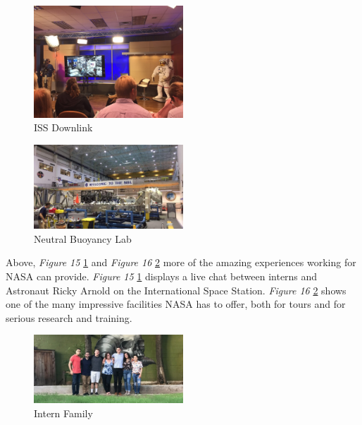 \documentclass{article}
\begin{document}
\begin{figure}[!htb]
  \centering
  \includegraphics[width=0.5\textwidth]{assets/videodemonstration.png}
  \caption{ISS Downlink}
  \label{fig:videodemonstration}
\end{figure}

\begin{figure}[!htb]
  \centering
  \includegraphics[width=0.5\textwidth]{assets/welcometonbl.png}
  \caption{Neutral Buoyancy Lab}
  \label{fig:welcometonbl}
\end{figure}

Above, \textit{Figure 15} \ref{fig:videodemonstration} and 
\textit{Figure 16} \ref{fig:welcometonbl} more of the amazing 
experiences working for NASA can provide. \textit{Figure 15} 
\ref{fig:videodemonstration} displays a live chat between interns and 
Astronaut Ricky Arnold on the International Space Station. 
\textit{Figure 16} \ref{fig:welcometonbl} shows one of the many 
impressive facilities NASA has to offer, both for tours and for serious 
research and training.

\begin{figure}[!htb]
  \centering
  \includegraphics[width=0.5\textwidth]{assets/ronniewithfriends.png}
  \caption{Intern Family}
  \label{fig:ronniewithfriends}
\end{figure}
\end{document}
